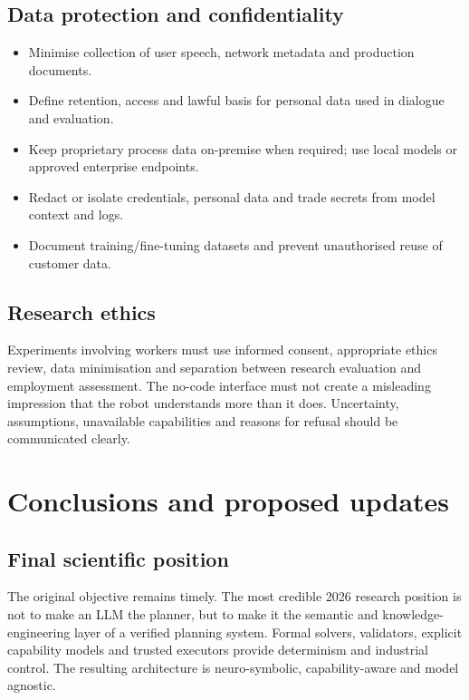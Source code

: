 \documentclass{plan4ari_report}
\begin{document}
\subsection{Data protection and confidentiality}
\begin{itemize}
\item Minimise collection of user speech, network metadata and production documents.
\item Define retention, access and lawful basis for personal data used in dialogue and evaluation.
\item Keep proprietary process data on-premise when required; use local models or approved enterprise endpoints.
\item Redact or isolate credentials, personal data and trade secrets from model context and logs.
\item Document training/fine-tuning datasets and prevent unauthorised reuse of customer data.
\end{itemize}

\subsection{Research ethics}
Experiments involving workers must use informed consent, appropriate ethics review, data minimisation and separation between research evaluation and employment assessment. The no-code interface must not create a misleading impression that the robot understands more than it does. Uncertainty, assumptions, unavailable capabilities and reasons for refusal should be communicated clearly.

\section{Conclusions and proposed updates}\label{sec:conclusions}

\subsection{Final scientific position}
\begin{planbox}
The original \PlanARI{} objective remains timely. The most credible 2026 research position is not to make an LLM the planner, but to make it the semantic and knowledge-engineering layer of a verified planning system. Formal solvers, validators, explicit capability models and trusted executors provide determinism and industrial control. The resulting architecture is neuro-symbolic, capability-aware and model agnostic.
\end{planbox}
\end{document}
